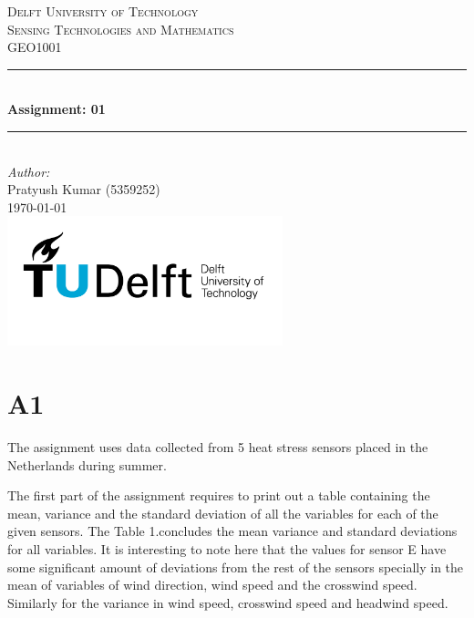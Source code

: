 \documentclass[a4paper]{article}
\begin{document}
\begin{titlepage}

\newcommand{\HRule}{\rule{\linewidth}{0.5mm}} 							%
\center 
 
\textsc{\LARGE Delft University of Technology}\\[1cm]

\textsc{\Large Sensing Technologies and Mathematics}\\[0.2cm]
\textsc{\large GEO1001}\\[1cm] 										%
\HRule \\[0.8cm]
{ \huge \bfseries Assignment: 01}\\[0.7cm]								%
\HRule \\[2cm]
\large
\emph{Author:}\\
Pratyush Kumar (5359252)\\[1.5cm]													%
{\large \today}\\[5cm]
\includegraphics[width=0.6\textwidth]{images/TU_delft_logo.jpg}\\[1cm] 	%
\vfill 
\end{titlepage}


\newpage
\section*{A1}
The assignment uses data collected from 5 heat stress sensors \cite{Maiullari2020}  placed in the Netherlands during summer. 

The first part of the assignment requires to print out a table containing the mean, variance and the standard deviation of all the variables for each of the given sensors. The Table 1.concludes the mean variance and standard deviations for all variables. It is interesting to note here that the values for sensor E have some significant amount of deviations from the rest of the sensors specially in the mean of variables of wind direction, wind speed and the crosswind speed. Similarly for the variance in wind speed, crosswind speed and headwind speed.  
\end{document}
